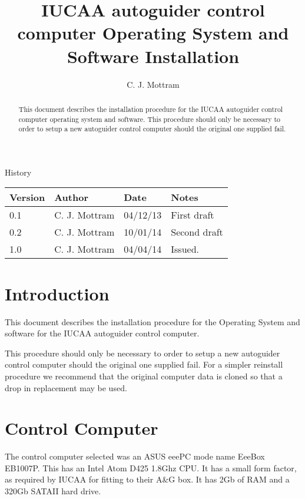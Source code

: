\documentclass[10pt,a4paper]{article}
\title{IUCAA autoguider control computer Operating System and Software Installation}
\author{C. J. Mottram}
\date{}
\begin{document}
\thispagestyle{empty}
\maketitle
\begin{abstract}
This document describes the installation procedure for the IUCAA autoguider control computer operating system and software. This procedure should only be necessary to order to setup a new autoguider control computer should the original one supplied fail.
\end{abstract}
\centerline{\Large History}
\begin{center}
\begin{tabular}{|l|l|l|p{15em}|}
\hline
{\bf Version} & {\bf Author} & {\bf Date} & {\bf Notes} \\
\hline
0.1 & C. J. Mottram & 04/12/13 & First draft \\
0.2 & C. J. Mottram & 10/01/14 & Second draft \\
1.0 & C. J. Mottram & 04/04/14 & Issued. \\
\hline
\end{tabular}
\end{center}

\newpage
\tableofcontents
\listoffigures
\listoftables
\newpage

\newcommand{\mytilde}{\raise.17ex\hbox{$\scriptstyle\mathtt{\sim}$}}

\section{Introduction}
This document describes the installation procedure for the Operating System and software for the IUCAA autoguider control computer.

This procedure should only be necessary to order to setup a new autoguider control computer should the original one supplied fail. For a simpler reinstall procedure we recommend that the original computer data is cloned so that a drop in replacement may be used.

\section{Control Computer}

The control computer selected was an ASUS eeePC mode name EeeBox EB1007P. This has an Intel Atom D425 1.8Ghz CPU. It has a small form factor, as required by IUCAA for fitting to their A\&G box. It has 2Gb of RAM and a 320Gb SATAII hard drive.
\end{document}
